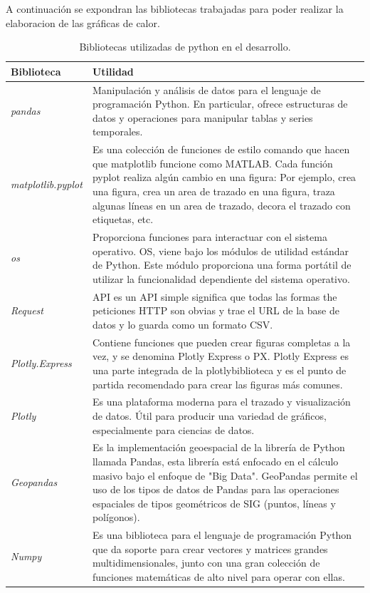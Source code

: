 \documentclass[conference,compsoc,onecolumn]{IEEEtran}
\begin{document}
\medskip

A continuación se expondran las bibliotecas trabajadas para poder realizar la elaboracion de las gráficas de calor.

\begin{table}[H]
    \centering
    \begin{tabular}[c]{| m{15em} | m{35em} |} 
     \hline
     \textbf{Biblioteca} & \textbf{Utilidad}\\
     \hline
      \textit{pandas} & Manipulación y análisis de datos para el lenguaje de programación Python. En particular, ofrece estructuras de datos y operaciones para manipular tablas y series temporales.\\ 
     \hline
      \textit{matplotlib.pyplot} & Es una colección de funciones de estilo comando que hacen que matplotlib funcione como MATLAB. Cada función pyplot realiza algún cambio en una figura: Por ejemplo, crea una figura, crea un area de trazado en una figura, traza algunas líneas en un area de trazado, decora el trazado con etiquetas, etc.  \\ 
     \hline
      \textit{os} & Proporciona funciones para interactuar con el sistema operativo. OS, viene bajo los módulos de utilidad estándar de Python. Este módulo proporciona una forma portátil de utilizar la funcionalidad dependiente del sistema operativo. \\
     \hline
      \textit{Request} & API es un API simple significa que todas las formas the peticiones HTTP son obvias y trae el URL de la base de datos y lo guarda como un formato CSV.\\
      \hline
      \textit{Plotly.Express} & Contiene funciones que pueden crear figuras completas a la vez, y se denomina Plotly Express o PX. Plotly Express es una parte integrada de la plotlybiblioteca y es el punto de partida recomendado para crear las figuras más comunes.\\
      \hline
      \textit{Plotly} & Es una plataforma moderna para el trazado y visualización de datos. Útil para producir una variedad de gráficos, especialmente para ciencias de datos.\\
      \hline
      \textit{Geopandas} & Es la implementación geoespacial de la librería de Python llamada Pandas, esta librería está enfocado en el cálculo masivo bajo el enfoque de "Big Data". GeoPandas permite el uso de los tipos de datos de Pandas para las operaciones espaciales de tipos geométricos de SIG (puntos, líneas y polígonos).\\
      \hline
      \textit{Numpy} & Es una biblioteca para el lenguaje de programación Python que da soporte para crear vectores y matrices grandes multidimensionales, junto con una gran colección de funciones matemáticas de alto nivel para operar con ellas.\\
      \hline
    \end{tabular}
    \caption{Bibliotecas utilizadas de python en el desarrollo.}
    \label{table:ta}
    \end{table}
    
\end{document}
